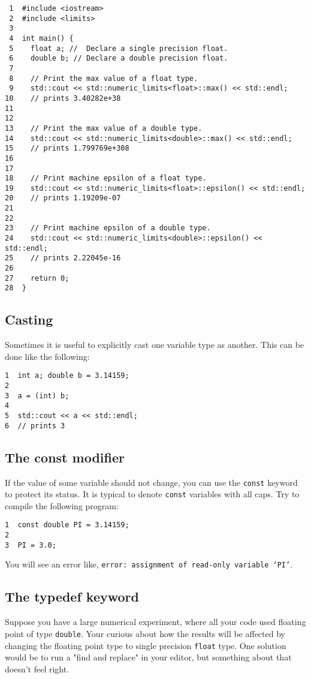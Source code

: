 \documentclass[11pt]{article}
\begin{document}
\begin{verbatim}
 1  #include <iostream>
 2  #include <limits>
 3  
 4  int main() {
 5    float a; //  Declare a single precision float.
 6    double b; // Declare a double precision float.
 7  
 8    // Print the max value of a float type.
 9    std::cout << std::numeric_limits<float>::max() << std::endl;
10    // prints 3.40282e+38
11  
12  
13    // Print the max value of a double type.
14    std::cout << std::numeric_limits<double>::max() << std::endl;
15    // prints 1.799769e+308
16  
17  
18    // Print machine epsilon of a float type.
19    std::cout << std::numeric_limits<float>::epsilon() << std::endl;
20    // prints 1.19209e-07
21  
22  
23    // Print machine epsilon of a double type.
24    std::cout << std::numeric_limits<double>::epsilon() << std::endl;
25    // prints 2.22045e-16
26  
27    return 0;
28  }
\end{verbatim}

\subsection{Casting}
\label{sec-3-4}

Sometimes it is useful to explicitly cast one variable type as another. 
This can be done like the following:

\begin{verbatim}
1  int a; double b = 3.14159;
2  
3  a = (int) b;
4  
5  std::cout << a << std::endl;
6  // prints 3
\end{verbatim}

\subsection{The const modifier}
\label{sec-3-5}

If the value of some variable should not change, you can use the \texttt{const}
keyword to protect its status. It is typical to denote \texttt{const} variables 
with all caps. Try to compile the following program:

\begin{verbatim}
1  const double PI = 3.14159;
2  
3  PI = 3.0;
\end{verbatim}

You will see an error like, \texttt{error: assignment of read-only variable ‘PI’}. 

\subsection{The typedef keyword}
\label{sec-3-6}
Suppose you have a large numerical experiment, where all your code used 
floating point of type \texttt{double}. Your curious about how the results will 
be affected by changing the floating point type to single precision \texttt{float}
type. One solution would be to run a "find and replace" in your editor, but 
something about that doesn't feel right.
\end{document}
